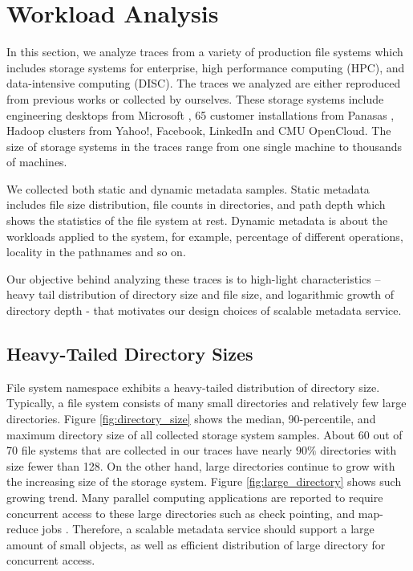 \section{Workload Analysis}

In this section, we analyze traces from a variety of production
file systems which includes storage systems for enterprise,
high performance computing (HPC), and
data-intensive computing (DISC).
The traces we analyzed are either reproduced from previous works
\cite{brent13, Bill11, Fan11} or collected by ourselves.
These storage systems include engineering desktops from Microsoft
\cite{Bill11}, 65 customer installations from Panasas \cite{brent13},
Hadoop clusters from Yahoo!, Facebook, LinkedIn and CMU OpenCloud.
The size of storage systems in the traces
range from one single machine to thousands of machines.

We collected both static and dynamic metadata samples.
Static metadata includes file size distribution,
file counts in directories, and path depth which shows
the statistics of the file system at rest.
Dynamic metadata is about the workloads applied to the system,
for example, percentage of different operations,
locality in the pathnames and so on.

Our objective behind analyzing these traces is to
high-light characteristics –
heavy tail distribution of directory size and file size,
and logarithmic growth of directory depth -
that motivates our design choices of scalable metadata service.

\subsection{Heavy-Tailed Directory Sizes}
File system namespace exhibits a heavy-tailed distribution
of directory size. Typically, a file system consists of
many small directories and relatively few large directories.
Figure \ref{fig:directory_size} shows the median, 90-percentile,
and maximum directory size of all collected storage system samples.
About 60 out of 70 file systems that are collected in our traces
have nearly $90\%$ directories with size fewer than 128.
On the other hand, large directories continue to grow with
the increasing size of the storage system. Figure \ref{fig:large_directory}
shows such growing trend. Many parallel computing applications
are reported to require concurrent access to these large directories
such as check pointing, and map-reduce jobs \cite{PLFS, MapReduce}.
Therefore, a scalable metadata service
should support a large amount of small objects, as well as
efficient distribution of large directory for concurrent access.


